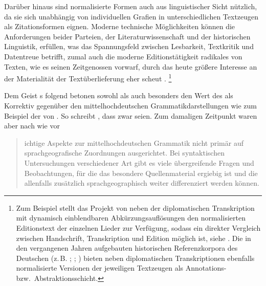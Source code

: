 Darüber hinaus sind normalisierte Formen auch aus
linguistischer Sicht nützlich, da sie sich unabhängig von individuellen Grafien
in unterschiedlichen Textzeugen als Zitations\-formen eignen. Moderne
technische Möglich\-keiten können die Anforderungen beider Parteien, der
Literaturwissenschaft und der historischen
Linguistik, erfüllen, was das Spannungsfeld zwischen
Lesbarkeit, Textkritik und Datentreue betrifft, zumal auch die moderne
Editionstätigkeit radikales  von Texten, wie
\citeauthor{wilhelm1932} es seinen Zeitgenossen vorwarf, durch das heute
größere Interesse an der Materialität der Textüberlieferung
eher scheut \autocite[vgl.][1306]{wegera2000}.%
%
	\footnote{Zum Beispiel stellt das Projekt  von
	\citet{ldmdigital} neben der diplomatischen Transkription
	mit dynamisch einblendbaren Abkürzungsauflösungen den
	normalisierten Editionstext der
	einzelnen Lieder zur Verfügung, sodass ein direkter Vergleich zwischen
	Handschrift, Transkription und Edition möglich ist, siehe
	. Die in den vergangenen Jahren aufgebauten
	historischen Referenzkorpora des Deutschen (z.\,B.
	\cite[vgl.][522--523]{dipper2015}; \cite{rem}; \cite{ddd}) bieten neben
	diplomatischen Transkriptionen ebenfalls normalisierte Versionen der
	jeweiligen Textzeugen als Annotations- bzw.\
	Abstraktionsschicht.}

Dem Geist \citeauthor{wilhelm1932}s folgend betonen sowohl \citet{deboor1976}
als auch \citet{schulze2011} besonders den Wert des \CAO{} als
Korrektiv gegenüber den
mittelhochdeutschen Grammatik\-darstel\-lungen wie zum
Beispiel der von \citet{paul2007}. So schreibt \citet[22]{schulze2011}, dass
zwar 
seien. Zum damaligen Zeitpunkt waren aber nach wie vor
\blockcquote[22]{schulze2011}{ichtige Aspekte zur
mittelhochdeutschen Grammatik \textelp{} nicht primär auf
sprachgeografische\is{Dialektgeografie} Zuordnungen ausgerichtet. Bei
syntaktischen Untersuchungen verschiedener Art gibt es viele übergreifende
Fragen und Beobachtungen, für die das besondere Quellenmaterial ergiebig ist
und die allenfalls zusätzlich sprachgeographisch\is{Dialektgeografie} weiter
differenziert werden können.}

